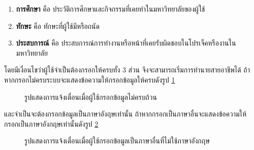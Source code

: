 \begin{enumerate}
    \item \textbf{การศึกษา} คือ ประวัติการศึกษาและกิจกรรมที่เคยทำในมหาวิทยาลัยของผู้ใช้
    \item \textbf{ทักษะ} คือ ทักษะที่ผู้ใช้มีหรือถนัด
    \item \textbf{ประสบการณ์} คือ ประสบการณ์การทำงานหรือหน้าที่เคยรับผิดชอบในโปรเจ็คหรืองานในมหาวิทยาลัย
\end{enumerate}

โดยมีเงื่อนไขว่าผู้ใช้จำเป็นต้องกรอกให้ครบทั้ง 3 ส่วน จึงจะสามารถเริ่มการทำนายสายอาชีพได้ ถ้าหากกรอกไม่ครบระบบจะแสดงข้อความให้กรอกข้อมูลให้ครบดังรูป \ref{fig:warning-CP}
\begin{figure}[H]\centering
    \caption{รูปแสดงการแจ้งเตื่อนเมื่อผู้ใช้กรอกข้อมูลไม่ครบถ้วน}\label{fig:warning-CP}
\end{figure}
และจำเป็นจะต้องกรอกข้อมูลเป็นภาษาอังฤษเท่านั้น ถ้าหากกรอกเป็นภาษาอื่นจะแสดงข้อความให้กรอกเป็นภาษาอังกฤษเท่านั้นดังรูป \ref{fig:warningTH-CP}
\begin{figure}[H]\centering
    \caption{รูปแสดงการแจ้งเตื่อนเมื่อผู้ใช้กรอกข้อมูลเป็นภาษาอื่นที่ไม่ใช้ภาษาอังกฤษ}\label{fig:warningTH-CP}
\end{figure}
